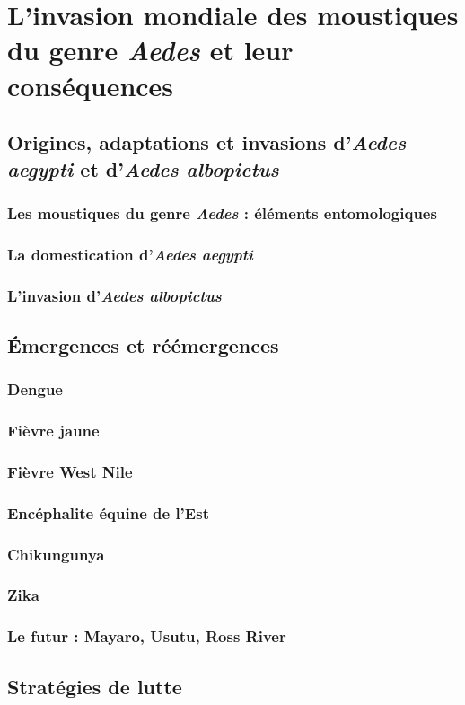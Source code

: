 \chapter{L'invasion mondiale des moustiques du genre {\em Aedes} et leur conséquences}

\section{Origines, adaptations et invasions d'{\em Aedes aegypti} et d'{\em Aedes albopictus}}

\subsection{Les moustiques du genre {\em Aedes} : éléments entomologiques}

\subsection{La domestication d'{\em Aedes aegypti}}

\subsection{L'invasion d'{\em Aedes albopictus} }

\section{Émergences et réémergences}

\subsection{Dengue   }

\subsection{Fièvre jaune   }

\subsection{Fièvre  West Nile}

\subsection{Encéphalite équine de l'Est}

\subsection{Chikungunya}

\subsection{Zika}

\subsection{Le futur : Mayaro, Usutu, Ross River}

\section{Stratégies de lutte}